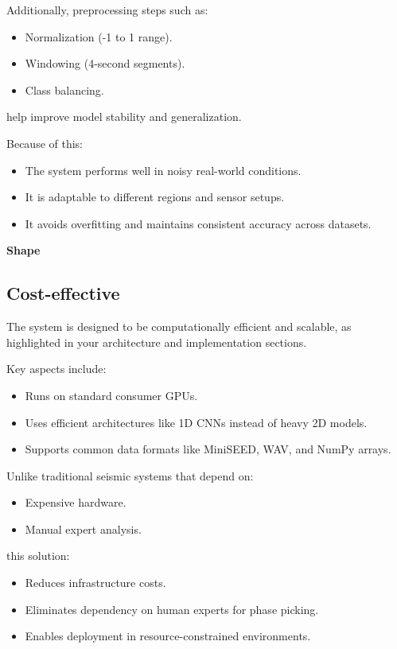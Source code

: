 \documentclass[a4paper,12pt]{report}
\begin{document}
Additionally, preprocessing steps such as:
\begin{itemize}
\item Normalization (-1 to 1 range).
\item Windowing (4-second segments).
\item Class balancing.
\end{itemize}

help improve model stability and generalization.

Because of this:
\begin{itemize}
\item The system performs well in noisy real-world conditions.
\item It is adaptable to different regions and sensor setups.
\item It avoids overfitting and maintains consistent accuracy across datasets.
\end{itemize}
\textbf{Shape}

\subsection{Cost-effective}
The system is designed to be computationally efficient and scalable, as highlighted in your architecture and implementation sections.

Key aspects include:
\begin{itemize}
\item Runs on standard consumer GPUs.
\item Uses efficient architectures like 1D CNNs instead of heavy 2D models.
\item Supports common data formats like MiniSEED, WAV, and NumPy arrays.
\end{itemize}

Unlike traditional seismic systems that depend on:
\begin{itemize}
\item Expensive hardware.
\item Manual expert analysis.
\end{itemize}

this solution:
\begin{itemize}
\item Reduces infrastructure costs.
\item Eliminates dependency on human experts for phase picking.
\item Enables deployment in resource-constrained environments.
\end{itemize}
\end{document}
